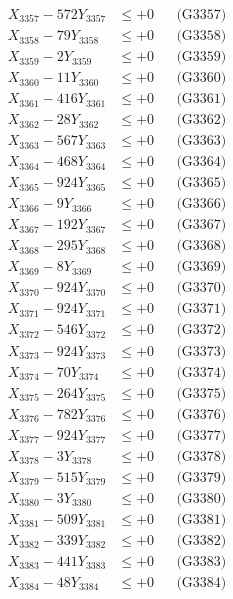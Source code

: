 \documentclass[a4paper,10pt]{article}
\begin{document}
{\begin{align}
X_{3357} - 572Y_{3357} &\leq +0 && \text{(G3357)} \\
X_{3358} - 79Y_{3358} &\leq +0 && \text{(G3358)} \\
X_{3359} - 2Y_{3359} &\leq +0 && \text{(G3359)} \\
X_{3360} - 11Y_{3360} &\leq +0 && \text{(G3360)} \\
\allowbreak
X_{3361} - 416Y_{3361} &\leq +0 && \text{(G3361)} \\
X_{3362} - 28Y_{3362} &\leq +0 && \text{(G3362)} \\
X_{3363} - 567Y_{3363} &\leq +0 && \text{(G3363)} \\
X_{3364} - 468Y_{3364} &\leq +0 && \text{(G3364)} \\
X_{3365} - 924Y_{3365} &\leq +0 && \text{(G3365)} \\
X_{3366} - 9Y_{3366} &\leq +0 && \text{(G3366)} \\
X_{3367} - 192Y_{3367} &\leq +0 && \text{(G3367)} \\
X_{3368} - 295Y_{3368} &\leq +0 && \text{(G3368)} \\
X_{3369} - 8Y_{3369} &\leq +0 && \text{(G3369)} \\
X_{3370} - 924Y_{3370} &\leq +0 && \text{(G3370)} \\
\allowbreak
X_{3371} - 924Y_{3371} &\leq +0 && \text{(G3371)} \\
X_{3372} - 546Y_{3372} &\leq +0 && \text{(G3372)} \\
X_{3373} - 924Y_{3373} &\leq +0 && \text{(G3373)} \\
X_{3374} - 70Y_{3374} &\leq +0 && \text{(G3374)} \\
X_{3375} - 264Y_{3375} &\leq +0 && \text{(G3375)} \\
X_{3376} - 782Y_{3376} &\leq +0 && \text{(G3376)} \\
X_{3377} - 924Y_{3377} &\leq +0 && \text{(G3377)} \\
X_{3378} - 3Y_{3378} &\leq +0 && \text{(G3378)} \\
X_{3379} - 515Y_{3379} &\leq +0 && \text{(G3379)} \\
X_{3380} - 3Y_{3380} &\leq +0 && \text{(G3380)} \\
\allowbreak
X_{3381} - 509Y_{3381} &\leq +0 && \text{(G3381)} \\
X_{3382} - 339Y_{3382} &\leq +0 && \text{(G3382)} \\
X_{3383} - 441Y_{3383} &\leq +0 && \text{(G3383)} \\
X_{3384} - 48Y_{3384} &\leq +0 && \text{(G3384)} \\

\end{align}}
\end{document}
